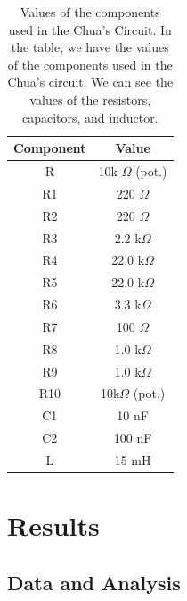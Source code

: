 \documentclass[12pt]{article}
\begin{document}
                
                \begin{table}[ht]
                        \centering
                        \begin{tabular}{|c|c|}
                                \hline
                                Component & Value \\
                                \hline
                                R & 10k $\Omega$ (pot.)\\
                                R1 & 220 $\Omega$ \\
                                R2 & 220 $\Omega$ \\
                                R3 & 2.2 k$\Omega$\\
                                R4 & 22.0 k$\Omega$ \\
                                R5 & 22.0 k$\Omega$ \\
                                R6 & 3.3 k$\Omega$ \\
                                R7 & 100 $\Omega$ \\
                                R8 & 1.0 k$\Omega$ \\
                                R9 & 1.0 k$\Omega$ \\
                                R10 & 10k$\Omega$ (pot.) \\
                                C1 & 10 nF \\
                                C2 & 100 nF \\
                                L & 15 mH \\
                                \hline
                        \end{tabular}
                        \caption{Values of the components used in the Chua's Circuit. In the table, we have the values of the 
                        components used in the Chua's circuit. We can see the values of the resistors, capacitors, and inductor.}
                        \label{tab: Values of the components used in the Chua's Circuit.}
                \end{table}
                        

                

\section{Results}
        \subsection{Data and Analysis}
\end{document}
